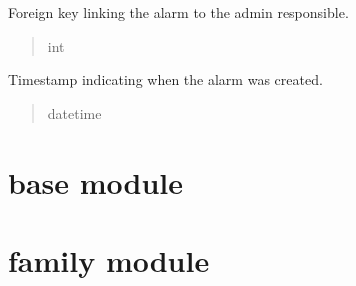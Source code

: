 \documentclass[letterpaper,10pt,english]{sphinxmanual}
\begin{document}
\begin{fulllineitems}
\begin{fulllineitems}
\label{\detokenize{app.mysql:app.mysql.alarm.Alarm.idAdmin}}
\pysigstartsignatures
\pysigline
{}
\pysigstopsignatures
\sphinxAtStartPar
Foreign key linking the alarm to the admin responsible.
\begin{quote}\begin{description}
\sphinxAtStartPar
int

\end{description}\end{quote}

\end{fulllineitems}


\begin{fulllineitems}
\label{\detokenize{app.mysql:app.mysql.alarm.Alarm.createDate}}
\pysigstartsignatures
\pysigline
{}
\pysigstopsignatures
\sphinxAtStartPar
Timestamp indicating when the alarm was created.
\begin{quote}\begin{description}
\sphinxAtStartPar
datetime

\end{description}\end{quote}

\end{fulllineitems}


\end{fulllineitems}



\section{base module}
\label{\detokenize{app.mysql:module-app.mysql.base}}\label{\detokenize{app.mysql:base-module}}

\section{family module}
\label{\detokenize{app.mysql:module-app.mysql.family}}\label{\detokenize{app.mysql:family-module}}
\end{document}
